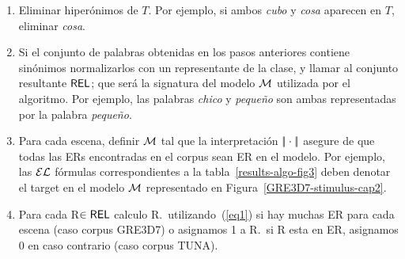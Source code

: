 \begin{enumerate}
\item Eliminar hiper\'onimos de $T$. Por ejemplo, si ambos \emph{cubo} y
  \emph{cosa} aparecen en $T$, eliminar \emph{cosa}.

\item Si el conjunto de palabras obtenidas en los pasos anteriores contiene
  sin\'onimos normalizarlos con un representante de la clase,
  y llamar al conjunto resultante $\textsf{REL}$; que ser\'a la signatura del
  modelo $\mathcal{M}$ utilizada por el algoritmo. Por ejemplo, las palabras \emph{chico}
  y \emph{peque\~no} son ambas representadas por la palabra \emph{peque\~no}.

\item Para cada escena, definir $\mathcal{M}$ tal que la interpretaci\'on
 $|\!|\cdot|\!|$ asegure de que todas las ERs encontradas en el corpus sean ER en
  el modelo. Por ejemplo, las $\mathcal{EL}$ f\'ormulas correspondientes a la tabla~\ref{results-algo-fig3} deben denotar el target en el
  modelo $\mathcal{M}$ representado en
  Figura~\ref{GRE3D7-stimulus-cap2}.
\item Para cada R$\in \textsf{REL}$ calculo R.\puse \ utilizando~(\ref{eq1}) si
  hay muchas ER para cada escena (caso corpus GRE3D7) o asignamos 1 a R.\puse \ si R esta en ER, asignamos 0 en caso contrario (caso corpus TUNA).


\end{enumerate}




